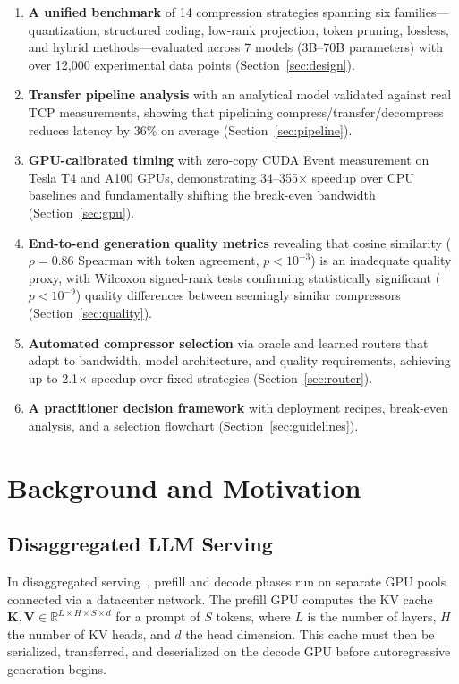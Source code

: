 \documentclass{article}
\begin{document}
\begin{enumerate}    \item \textbf{A unified benchmark} of 14 compression strategies spanning six families---quantization, structured coding, low-rank projection, token pruning, lossless, and hybrid methods---evaluated across 7 models (3B--70B parameters) with over 12{,}000 experimental data points (Section~\ref{sec:design}).
    \item \textbf{Transfer pipeline analysis} with an analytical model validated against real TCP measurements, showing that pipelining compress/transfer/decompress reduces latency by 36\% on average (Section~\ref{sec:pipeline}).
    \item \textbf{GPU-calibrated timing} with zero-copy CUDA Event measurement on Tesla T4 and A100 GPUs, demonstrating 34--355$\times$ speedup over CPU baselines and fundamentally shifting the break-even bandwidth (Section~\ref{sec:gpu}).
    \item \textbf{End-to-end generation quality metrics} revealing that cosine similarity ($\rho = 0.86$ Spearman with token agreement, $p < 10^{-3}$) is an inadequate quality proxy, with Wilcoxon signed-rank tests confirming statistically significant ($p < 10^{-9}$) quality differences between seemingly similar compressors (Section~\ref{sec:quality}).
    \item \textbf{Automated compressor selection} via oracle and learned routers that adapt to bandwidth, model architecture, and quality requirements, achieving up to 2.1$\times$ speedup over fixed strategies (Section~\ref{sec:router}).
    \item \textbf{A practitioner decision framework} with deployment recipes, break-even analysis, and a selection flowchart (Section~\ref{sec:guidelines}).
\end{enumerate}

\section{Background and Motivation}
\label{sec:background}

\subsection{Disaggregated LLM Serving}

In disaggregated serving~\citep{zhong2024distserve, patel2024splitwise}, prefill and decode phases run on separate GPU pools connected via a datacenter network. The prefill GPU computes the KV cache $\mathbf{K}, \mathbf{V} \in \mathbb{R}^{L \times H \times S \times d}$ for a prompt of $S$ tokens, where $L$ is the number of layers, $H$ the number of KV heads, and $d$ the head dimension. This cache must then be serialized, transferred, and deserialized on the decode GPU before autoregressive generation begins.
\end{document}
